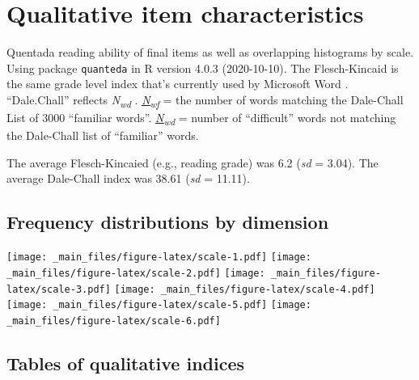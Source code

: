 \documentclass[
]{book}
\begin{document}
\hypertarget{qualitative-item-characteristics}{%
\chapter{Qualitative item characteristics}\label{qualitative-item-characteristics}}

Quentada reading ability of final items as well as overlapping histograms by scale. Using package \texttt{quanteda} in R version 4.0.3 (2020-10-10). The Flesch-Kincaid is the same grade level index that's currently used by Microsoft Word \citep{kincaid_derivation_1975}. ``Dale.Chall'' reflects \emph{N\textsubscript{wd}} \citep[``difficulty'' of words;][]{chall_dale_1995}. \href{https://quanteda.io/reference/textstat_readability.html}{\emph{N\textsubscript{wf}}} = the number of words matching the Dale-Chall List of 3000 ``familiar words''. \href{https://quanteda.io/reference/textstat_readability.html}{\emph{N\textsubscript{wd}}} = number of ``difficult'' words not matching the Dale-Chall list of ``familiar'' words.

The average Flesch-Kincaied (e.g., reading grade) was 6.2 (\emph{sd} = 3.04). The average Dale-Chall index was 38.61 (\emph{sd} = 11.11).

\hypertarget{frequency-distributions-by-dimension}{%
\section{Frequency distributions by dimension}\label{frequency-distributions-by-dimension}}

\texttt{[image: \_main\_files/figure-latex/scale-1.pdf]} \texttt{[image: \_main\_files/figure-latex/scale-2.pdf]} \texttt{[image: \_main\_files/figure-latex/scale-3.pdf]} \texttt{[image: \_main\_files/figure-latex/scale-4.pdf]} \texttt{[image: \_main\_files/figure-latex/scale-5.pdf]} \texttt{[image: \_main\_files/figure-latex/scale-6.pdf]}

\hypertarget{tables-of-qualitative-indices}{%
\section{Tables of qualitative indices}\label{tables-of-qualitative-indices}}
\end{document}
